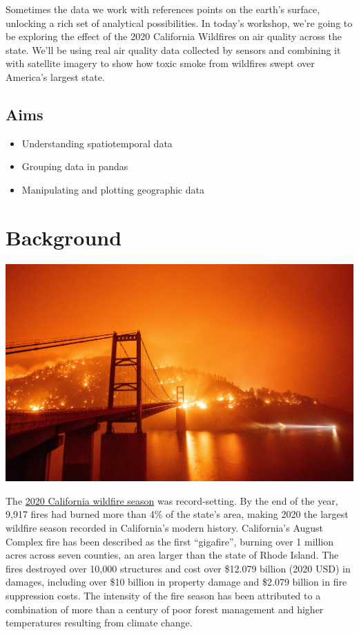 \documentclass[
  letterpaper,
  DIV=11,
  numbers=noendperiod]{scrreprt}
\providecommand{\tightlist}{%
  \setlength{\itemsep}{0pt}\setlength{\parskip}{0pt}}\usepackage{longtable,booktabs,array}
\begin{document}
Sometimes the data we work with references points on the earth's
surface, unlocking a rich set of analytical possibilities. In today's
workshop, we're going to be exploring the effect of the 2020 California
Wildfires on air quality across the state. We'll be using real air
quality data collected by sensors and combining it with satellite
imagery to show how toxic smoke from wildfires swept over America's
largest state.

\hypertarget{aims-1}{%
\subsection{Aims}\label{aims-1}}

\begin{itemize}
\tightlist
\item
  Understanding spatiotemporal data
\item
  Grouping data in pandas
\item
  Manipulating and plotting geographic data
\end{itemize}

\hypertarget{background}{%
\section{Background}\label{background}}

\includegraphics{index_files/mediabag/106695701-1599664926.jpg}

The \href{https://en.wikipedia.org/wiki/2020_California_wildfires}{2020
California wildfire season} was record-setting. By the end of the year,
9,917 fires had burned more than 4\% of the state's area, making 2020
the largest wildfire season recorded in California's modern history.
California's August Complex fire has been described as the first
``gigafire'', burning over 1 million acres across seven counties, an
area larger than the state of Rhode Island. The fires destroyed over
10,000 structures and cost over \$12.079 billion (2020 USD) in damages,
including over \$10 billion in property damage and \$2.079 billion in
fire suppression costs. The intensity of the fire season has been
attributed to a combination of more than a century of poor forest
management and higher temperatures resulting from climate change.
\end{document}
